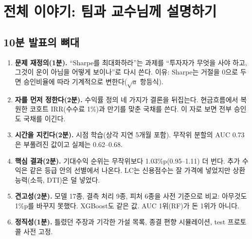 \chapter{전체 이야기: 팀과 교수님께 설명하기}

\section{10분 발표의 뼈대}
\begin{enumerate}[leftmargin=*]
\item \textbf{문제 재정의(1분).} ``Sharpe를 최대화하라''는 과제를 ``투자자가 무엇을 사야 하고, 그것이 운이 아님을 어떻게 보이나''로 다시 쓴다. 이유: Sharpe는 거절을 0으로 두면 승인비율에 따라 기계적으로 변한다($\sqrt a$ 항등식).
\item \textbf{자를 먼저 정한다(2분).} 수익률 정의 네 가지가 결론을 뒤집는다. 현금흐름에서 복원한 코호트 IRR(수수료 1\%)과 만기를 맞춘 국채를 쓴다. 이 자로 보면 전부 승인도 국채를 이긴다.
\item \textbf{시간을 지킨다(2분).} 시점 학습(상각 지연 5개월 포함). 무작위 분할의 AUC 0.73은 부풀려진 값이고 실제는 0.62--0.68.
\item \textbf{핵심 결과(2분).} 기대수익 순위는 무작위보다 1.03\%p(0.95--1.11) 더 번다. 추가 수익은 같은 등급 안의 선별에서 나온다. LC는 신용점수는 잘 가격에 넣었지만 상환 능력(소득, DTI)은 덜 넣었다.
\item \textbf{견고성(2분).} 모델 17종, 결측 처리 9종, 피처 6종을 사전 기준으로 비교: 아무것도 1\%p를 바꾸지 못했다. XGBoost도 같은 값. AUC 1위(RF)가 돈 1위가 아니다.
\item \textbf{정직성(1분).} 틀렸던 주장과 기각한 가설 목록, 종결 편향 시뮬레이션, test 프로토콜 사전 고정.
\end{enumerate}

